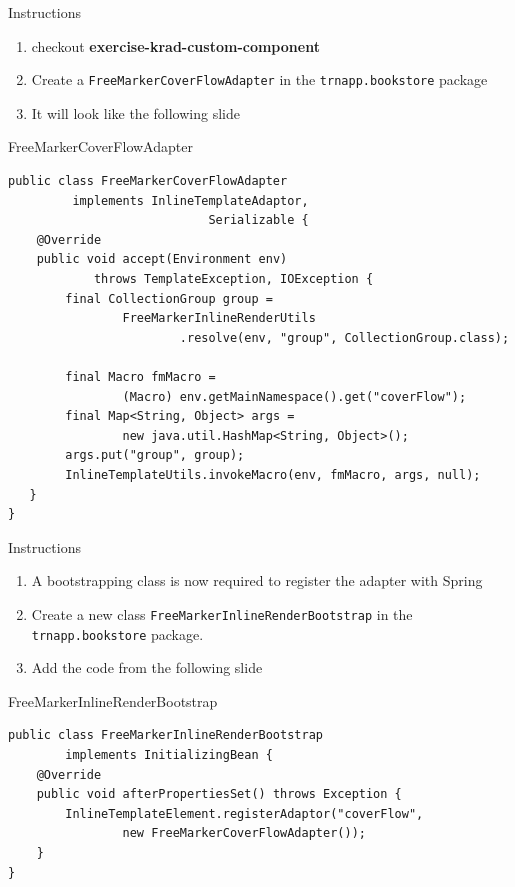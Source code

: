 \documentclass[xcolor=dvipsnames,14pt,professionalfonts]{beamer}
\begin{document}
\begin{frame}{Instructions}
  \begin{enumerate}
    \item checkout \textbf{exercise-krad-custom-component}
    \item Create a \texttt{FreeMarkerCoverFlowAdapter} in the
      \texttt{trnapp.bookstore} package
    \item It will look like the following slide
  \end{enumerate}
\end{frame}

 \begin{frame}[fragile]{FreeMarkerCoverFlowAdapter}
   \begin{verbatim}
public class FreeMarkerCoverFlowAdapter 
         implements InlineTemplateAdaptor, 
                            Serializable {
    @Override
    public void accept(Environment env) 
            throws TemplateException, IOException {
        final CollectionGroup group = 
                FreeMarkerInlineRenderUtils
                        .resolve(env, "group", CollectionGroup.class);

        final Macro fmMacro = 
                (Macro) env.getMainNamespace().get("coverFlow");
        final Map<String, Object> args = 
                new java.util.HashMap<String, Object>();
        args.put("group", group);
        InlineTemplateUtils.invokeMacro(env, fmMacro, args, null); 
   }
}
    \end{verbatim}
\end{frame}

\begin{frame}{Instructions}
  \begin{enumerate}
    \item A bootstrapping class is now required to
      register the adapter with Spring
    \item Create a new class \texttt{FreeMarkerInlineRenderBootstrap}
      in the \texttt{trnapp.bookstore} package.
    \item Add the code from the following slide
  \end{enumerate}
\end{frame}

 \begin{frame}[fragile]{FreeMarkerInlineRenderBootstrap}
   \begin{verbatim}
public class FreeMarkerInlineRenderBootstrap 
        implements InitializingBean {
    @Override
    public void afterPropertiesSet() throws Exception {
        InlineTemplateElement.registerAdaptor("coverFlow", 
                new FreeMarkerCoverFlowAdapter());
    }
}
    \end{verbatim}
\end{frame}
\end{document}
